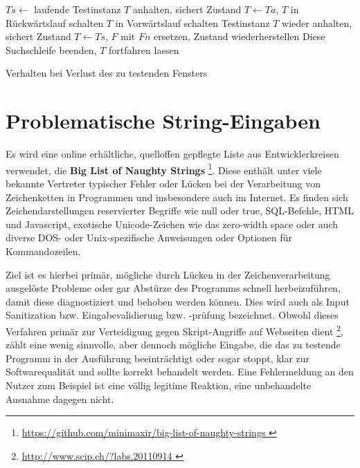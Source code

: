 \begin{algorithm} \SetAlgoLined
	$Ts \longleftarrow$ laufende Testinstanz $T$ anhalten, sichert Zustand\;
	$T \longleftarrow Ta$, $T$ in Rückwärtslauf schalten\;
	{
		{
			$T$ in Vorwärtslauf schalten\;
			Testinstanz $T$ wieder anhalten, sichert Zustand\;
			$T \longleftarrow Ts$, $F$ mit $Fn$ ersetzen, Zustand wiederherstellen\;
			Diese Suchschleife beenden, $T$ fortfahren lassen\;
		}
	}
	
	\caption{Verhalten bei Verlust des zu testenden Fensters}
	\label{alg:autotesterwindowloss}
\end{algorithm}


\section{Problematische String-Eingaben}\label{section:naughtystrings}

Es wird eine online erhältliche, quelloffen gepflegte Liste aus Entwicklerkreisen verwendet, 
die \textbf{Big List of Naughty Strings} \footnote{\url{ https://github.com/minimaxir/big-list-of-naughty-strings }}. Diese enthält unter viele bekannte
Vertreter typischer Fehler oder Lücken bei der Verarbeitung von Zeichenketten in Programmen und
insbesondere auch im Internet. Es finden sich Zeichendarstellungen reservierter Begriffe wie
\glqq{}null\grqq{} oder \glqq{}true\grqq{}, SQL-Befehle, HTML und Javascript, exotische Unicode-Zeichen wie das
\glqq{}zero-width space\grqq{} \cite{unicodezerowidth} oder auch diverse DOS- oder Unix-spezifische
Anweisungen oder Optionen für Kommandozeilen.

Ziel ist es hierbei primär, mögliche durch Lücken in der Zeichenverarbeitung ausgelöste Probleme oder gar
Abstürze des Programms schnell herbeizuführen, damit diese diagnostiziert und behoben werden können.
Dies wird auch als \glqq{}Input Sanitization\grqq{} bzw. Eingabevalidierung bzw. -prüfung bezeichnet. 
Obwohl dieses Verfahren primär zur Verteidigung gegen Skript-Angriffe auf Webseiten dient
\footnote{\url{ http://www.scip.ch/?labs.20110914 }}, 
zählt eine wenig sinnvolle, aber dennoch mögliche Eingabe, 
die das zu testende Programm in der Ausführung beeinträchtigt oder sogar stoppt, klar zur 
Softwarequalität und sollte korrekt behandelt werden. Eine Fehlermeldung an den Nutzer zum
Beispiel ist eine völlig legitime Reaktion, eine unbehandelte Ausnahme dagegen nicht.


